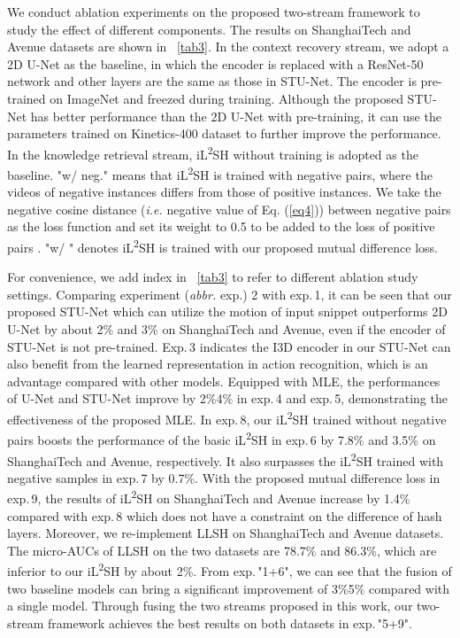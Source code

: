 \documentclass[lettersize,journal]{IEEEtran}
\begin{document}
We conduct ablation experiments on the proposed two-stream framework to study the effect of different components.
The results on ShanghaiTech and Avenue datasets are shown in \tablename~\ref{tab3}.
In the context recovery stream, we adopt a 2D U-Net as the baseline, in which the encoder is replaced with a ResNet-50 \cite{DeepResidual2016he} network and other layers are the same as those in STU-Net.
The encoder is pre-trained on ImageNet \cite{ImageNetLarge2015russakovsky} and freezed during training.
Although the proposed STU-Net has better performance than the 2D U-Net with pre-training, it can use the parameters trained on Kinetics-400 dataset to further improve the performance.
In the knowledge retrieval stream, iL\textsuperscript{2}SH without training is adopted as the baseline.
"w/ neg." means that iL\textsuperscript{2}SH is trained with negative pairs, where the videos of negative instances differs from those of positive instances.
We take the negative cosine distance (\textit{i.e.} negative value of Eq. (\ref{eq4})) between negative pairs as the loss function and set its weight to 0.5 to be added to the loss of positive pairs .
"w/ " denotes iL\textsuperscript{2}SH is trained with our proposed mutual difference loss.

For convenience, we add index in \tablename~\ref{tab3} to refer to different ablation study settings.
Comparing experiment (\textit{abbr.} exp.) 2 with exp.\,1, it can be seen that our proposed STU-Net which can utilize the motion of input snippet outperforms 2D U-Net by about 2\% and 3\% on ShanghaiTech and Avenue, even if the encoder of STU-Net is not pre-trained.
Exp.\,3 indicates the I3D encoder in our STU-Net can also benefit from the learned representation in action recognition, which is an advantage compared with other models.
Equipped with MLE, the performances of U-Net and STU-Net improve by 2\%4\% in exp.\,4 and exp.\,5, demonstrating the effectiveness of the proposed MLE.
In exp.\,8, our iL\textsuperscript{2}SH trained without negative pairs boosts the performance of the basic iL\textsuperscript{2}SH in exp.\,6 by 7.8\% and 3.5\% on ShanghaiTech and Avenue, respectively.
It also surpasses the iL\textsuperscript{2}SH trained with negative samples in exp.\,7 by 0.7\%.
With the proposed mutual difference loss in exp.\,9, the results of iL\textsuperscript{2}SH on ShanghaiTech and Avenue increase by 1.4\% compared with exp.\,8 which does not have a constraint on the difference of hash layers.
Moreover, we re-implement LLSH \cite{LearnableLocalitySensitive2021lu} on ShanghaiTech and Avenue datasets. The micro-AUCs of LLSH on the two datasets are 78.7\% and 86.3\%, which are inferior to our iL\textsuperscript{2}SH by about 2\%.
From exp.\,"1+6", we can see that the fusion of two baseline models can bring a significant improvement of 3\%5\% compared with a single model.
Through fusing the two streams proposed in this work, our two-stream framework achieves the best results on both datasets in exp.\,"5+9".
\end{document}
